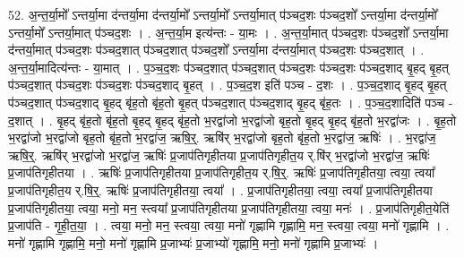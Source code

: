 \documentclass[17pt]{extarticle}
\begin{document}
52. अ॒न्त॒र्या॒मो᳚ ऽन्तर्या॒मा द॑न्तर्या॒मा द॑न्तर्या॒मो᳚ ऽन्तर्या॒मो᳚ ऽन्तर्या॒मात् प॑ञ्चद॒शः प॑ञ्चद॒शो᳚ ऽन्तर्या॒मा द॑न्तर्या॒मो᳚ ऽन्तर्या॒मो᳚ ऽन्तर्या॒मात् प॑ञ्चद॒शः । . अ॒न्त॒र्या॒म इत्य॑न्तः - या॒मः । . अ॒न्त॒र्या॒मात् प॑ञ्चद॒शः प॑ञ्चद॒शो᳚ ऽन्तर्या॒मा द॑न्तर्या॒मात् प॑ञ्चद॒शः प॑ञ्चद॒शात् प॑ञ्चद॒शात् प॑ञ्चद॒शो᳚ ऽन्तर्या॒मा द॑न्तर्या॒मात् प॑ञ्चद॒शः प॑ञ्चद॒शात् । . अ॒न्त॒र्या॒मादित्य॑न्तः - या॒मात् । . प॒ञ्च॒द॒शः प॑ञ्चद॒शात् प॑ञ्चद॒शात् प॑ञ्चद॒शः प॑ञ्चद॒शः प॑ञ्चद॒शाद् बृ॒हद् बृ॒हत् प॑ञ्चद॒शात् प॑ञ्चद॒शः प॑ञ्चद॒शः प॑ञ्चद॒शाद् बृ॒हत् । . प॒ञ्च॒द॒श इति॑ पञ्च - द॒शः । . प॒ञ्च॒द॒शाद् बृ॒हद् बृ॒हत् प॑ञ्चद॒शात् प॑ञ्चद॒शाद् बृ॒हद् बृ॑ह॒तो बृ॑ह॒तो बृ॒हत् प॑ञ्चद॒शात् प॑ञ्चद॒शाद् बृ॒हद् बृ॑ह॒तः । . प॒ञ्च॒द॒शादिति॑ पञ्च - द॒शात् । . बृ॒हद् बृ॑ह॒तो बृ॑ह॒तो बृ॒हद् बृ॒हद् बृ॑ह॒तो भ॒रद्वा॑जो भ॒रद्वा॑जो बृह॒तो बृ॒हद् बृ॒हद् बृ॑ह॒तो भ॒रद्वा॑जः । . बृ॒ह॒तो भ॒रद्वा॑जो भ॒रद्वा॑जो बृह॒तो बृ॑ह॒तो भ॒रद्वा॑ज॒ ऋषि॒र्॒. ऋषि॑र् भ॒रद्वा॑जो बृह॒तो बृ॑ह॒तो भ॒रद्वा॑ज॒ ऋषिः॑ । . भ॒रद्वा॑ज॒ ऋषि॒र्॒. ऋषि॑र् भ॒रद्वा॑जो भ॒रद्वा॑ज॒ ऋषिः॑ प्र॒जाप॑तिगृहीतया प्र॒जाप॑तिगृहीत॒य र्.षि॑र् भ॒रद्वा॑जो भ॒रद्वा॑ज॒ ऋषिः॑ प्र॒जाप॑तिगृहीतया । . ऋषिः॑ प्र॒जाप॑तिगृहीतया प्र॒जाप॑तिगृहीत॒य र्.षि॒र्॒. ऋषिः॑ प्र॒जाप॑तिगृहीतया॒ त्वया॒ त्वया᳚ प्र॒जाप॑तिगृहीत॒य र्.षि॒र्॒. ऋषिः॑ प्र॒जाप॑तिगृहीतया॒ त्वया᳚ । . प्र॒जाप॑तिगृहीतया॒ त्वया॒ त्वया᳚ प्र॒जाप॑तिगृहीतया प्र॒जाप॑तिगृहीतया॒ त्वया॒ मनो॒ मन॒ स्त्वया᳚ प्र॒जाप॑तिगृहीतया प्र॒जाप॑तिगृहीतया॒ त्वया॒ मनः॑ । . प्र॒जाप॑तिगृहीत॒येति॑ प्र॒जाप॑ति - गृ॒ही॒त॒या॒ । . त्वया॒ मनो॒ मन॒ स्त्वया॒ त्वया॒ मनो॑ गृह्णामि गृह्णामि॒ मन॒ स्त्वया॒ त्वया॒ मनो॑ गृह्णामि । . मनो॑ गृह्णामि गृह्णामि॒ मनो॒ मनो॑ गृह्णामि प्र॒जाभ्यः॑ प्र॒जाभ्यो॑ गृह्णामि॒ मनो॒ मनो॑ गृह्णामि प्र॒जाभ्यः॑ । \newline
\pagebreak
{}
\end{document}
